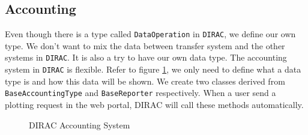 \subsection{Accounting}

Even though there is a type called {\tt DataOperation} in {\tt DIRAC},
we define our own type. We don't want to mix the data between 
transfer system and the other systems in {\tt DIRAC}.
It is also a try to have our own data type.
The accounting system 
in {\tt DIRAC} is flexible. Refer to figure \ref{fig:acct},
we only need to define 
what a data type is and how this data will be shown.
We create two classes derived from {\tt BaseAccountingType}
and {\tt BaseReporter} respectively.
When a user send a plotting request in the web portal, 
DIRAC will call these methods automatically.
\begin{figure}[htbp]
    
    \caption{\label{fig:acct}DIRAC Accounting System}
\end{figure}
